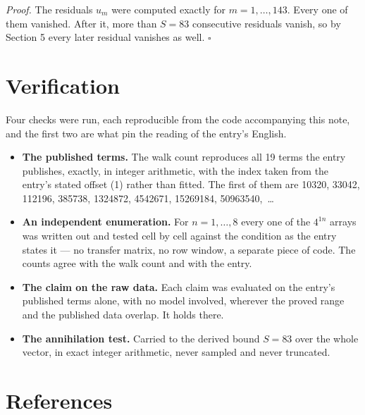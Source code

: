 \documentclass[11pt]{article}
\theoremstyle{definition}
\begin{document}
{\itshape Proof.} The residuals $u_m$ were computed exactly for $m = 1,\dots,143$. Every one of them vanished. After it, more than $S = 83$ consecutive residuals vanish, so by Section 5 every later residual vanishes as well. $\square$

\section{Verification}

Four checks were run, each reproducible from the code accompanying this note, and the first two are what pin the reading of the entry's English.

\begin{itemize}

\item {\bfseries The published terms.} The walk count reproduces all 19 terms the entry publishes, exactly, in integer arithmetic, with the index taken from the entry's stated offset (1) rather than fitted. The first of them are 10320, 33042, 112196, 385738, 1324872, 4542671, 15269184, 50963540,~\dots

\item {\bfseries An independent enumeration.} For $n = 1,\dots,8$ every one of the $4^{1n}$ arrays was written out and tested cell by cell against the condition as the entry states it --- no transfer matrix, no row window, a separate piece of code. The counts agree with the walk count and with the entry.

\item {\bfseries The claim on the raw data.} Each claim was evaluated on the entry's published terms alone, with no model involved, wherever the proved range and the published data overlap. It holds there.

\item {\bfseries The annihilation test.} Carried to the derived bound $S = 83$ over the whole vector, in exact integer arithmetic, never sampled and never truncated.

\end{itemize}

\section{References}
\end{document}
